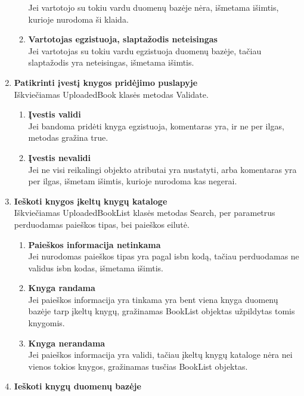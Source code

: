 \documentclass{VUMIFPSkursinis}
\begin{document}
\begin{enumerate}[label=\textbf{T\arabic*}]
\begin{enumerate}[label*=\textbf{.\arabic*}]
						Jei vartotojo su tokiu vardu duomenų bazėje nėra, 
						išmetama išimtis, kurioje nurodoma ši klaida.
					\item \textbf{Vartotojas egzistuoja, slaptažodis neteisingas}\\
						Jei vartotojas su tokiu vardu egzistuoja duomenų bazėje, 
						tačiau slaptažodis yra neteisingas, išmetama išimtis.
				\end{enumerate}
			\item \textbf{Patikrinti įvestį knygos pridėjimo puslapyje}\\
				Iškviečiamas UploadedBook klasės metodas Validate.
				\begin{enumerate}[label*=\textbf{.\arabic*}]
					\item \textbf{Įvestis validi}\\
						Jei bandoma pridėti knyga egzistuoja, komentaras yra, 
						ir ne per ilgas, metodas gražina true.
					\item \textbf{Įvestis nevalidi}\\
						Jei ne visi reikalingi objekto atributai yra nustatyti,
						arba komentaras yra per ilgas, išmetam išimtis, kurioje nurodoma kas negerai.
				\end{enumerate}
			\item \textbf{Ieškoti knygos įkeltų knygų kataloge}\\
				Iškviečiamas UploadedBookList klasės metodas Search, per parametrus perduodamas paieškos tipas,
				bei paieškos eilutė.
				\begin{enumerate}[label*=\textbf{.\arabic*}]
					\item \textbf{Paieškos informacija netinkama}\\
						Jei nurodomas paieškos tipas yra pagal isbn kodą, tačiau perduodamas ne validus isbn
						kodas, išmetama išimtis.
					\item \textbf{Knyga randama}\\
						Jei paieškos informacija yra tinkama yra bent viena knyga duomenų bazėje tarp įkeltų knygų,
						gražinamas BookList objektas užpildytas tomis knygomis.
					\item \textbf{Knyga nerandama}\\
						Jei paieškos informacija yra validi, tačiau įkeltų knygų kataloge nėra nei vienos tokios knygos,
						gražinamas tusčias BookList objektas.
				\end{enumerate}
			\item \textbf{Ieškoti knygų duomenų bazėje}\\

\end{enumerate}
\end{document}
